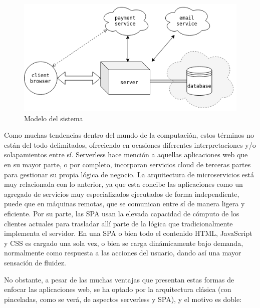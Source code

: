 \documentclass[a4paper,12pt,twoside,openright]{report}
\begin{document}
    \begin{figure}[h]
    	\centering
    	\includegraphics[width=\textwidth]{desing_general}
    	\caption{Modelo del sistema}
    	\label{fig:desing_general}
    \end{figure}
    
    Como muchas tendencias dentro del mundo de la computación, estos términos no están del todo delimitados, ofreciendo en ocasiones diferentes interpretaciones y/o solapamientos entre sí. Serverless hace mención a aquellas aplicaciones web que en su mayor parte, o por completo, incorporan servicios cloud de terceras partes para gestionar su propia lógica de negocio. La arquitectura de microservicios está muy relacionada con lo anterior, ya que esta concibe las aplicaciones como un agregado de servicios muy especializados ejecutados de forma independiente, puede que en máquinas remotas, que se comunican entre sí de manera ligera y eficiente. Por su parte, las SPA usan la elevada capacidad de cómputo de los clientes actuales para trasladar allí parte de la lógica que tradicionalmente implementa el servidor. En una SPA o bien todo el contenido HTML, JavaScript y CSS es cargado una sola vez, o bien se carga dinámicamente bajo demanda, normalmente como respuesta a las acciones del usuario, dando así una mayor sensación de fluidez.
    
    No obstante, a pesar de las muchas ventajas que presentan estas formas de enfocar las aplicaciones web, se ha optado por la arquitectura clásica (con pinceladas, como se verá, de aspectos serverless y SPA), y el motivo es doble:
    
\end{document}
